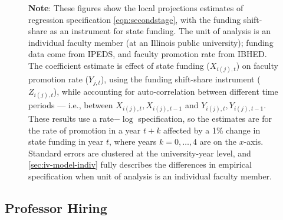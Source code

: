 \begin{figure}[H]
\begin{subfigure}[b]{0.495\textwidth}
        \label{fig:exit-administrator-illinois-lp-rolling}
    \end{subfigure}
    \label{fig:exit-illinois-lp-rolling}
    \justify
    \footnotesize
    \textbf{Note}:
    These figures show the local projections estimates of regression specification \eqref{eqn:secondstage}, with the funding shift-share as an instrument for state funding.
    The unit of analysis is an individual faculty member (at an Illinois public university); funding data come from IPEDS, and faculty promotion rate from IBHED.
    The coefficient estimate is effect of state funding ($X_{i(j),t}$) on faculty promotion rate ($Y_{j,t}$), using the funding shift-share instrument ($Z_{i(j),t}$), while accounting for auto-correlation between different time periods --- i.e., between $X_{i(j),t}, X_{i(j),t-1}$ and $Y_{i(j),t}, Y_{i(j),t-1}$.
    These results use a rate$-\log$ specification, so the estimates are for the rate of promotion in a year $t+k$ affected by a 1\% change in state funding in year $t$, where years $k = 0, \hdots, 4$ are on the $x$-axis. 
    Standard errors are clustered at the university-year level, and \autoref{sec:iv-model-indiv} fully describes the differences in empirical specification when unit of analysis is an individual faculty member.
\end{figure}

\newpage
\subsection{Professor Hiring}
\label{sec:appendix-hiring}


